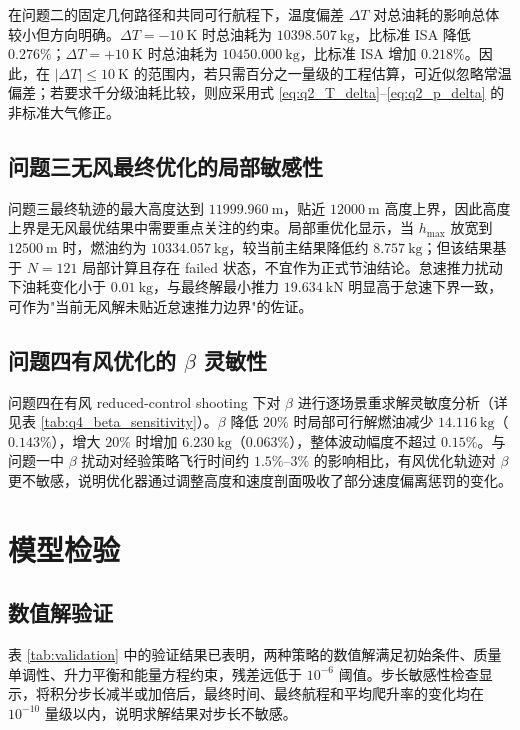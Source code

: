 \documentclass[withoutpreface,bwprint]{cumcmthesis}
\begin{document}
在问题二的固定几何路径和共同可行航程下，温度偏差 $\Delta T$ 对总油耗的影响总体较小但方向明确。$\Delta T=-10\ \mathrm{K}$ 时总油耗为 $10398.507\ \mathrm{kg}$，比标准 ISA 降低 $0.276\%$；$\Delta T=+10\ \mathrm{K}$ 时总油耗为 $10450.000\ \mathrm{kg}$，比标准 ISA 增加 $0.218\%$。因此，在 $|\Delta T|\leq10\ \mathrm{K}$ 的范围内，若只需百分之一量级的工程估算，可近似忽略常温偏差；若要求千分级油耗比较，则应采用式 \eqref{eq:q2_T_delta}--\eqref{eq:q2_p_delta} 的非标准大气修正。

\subsection{问题三无风最终优化的局部敏感性}

问题三最终轨迹的最大高度达到 $11999.960\ \mathrm{m}$，贴近 $12000\ \mathrm{m}$ 高度上界，因此高度上界是无风最优结果中需要重点关注的约束。局部重优化显示，当 $h_{\max}$ 放宽到 $12500\ \mathrm{m}$ 时，燃油约为 $10334.057\ \mathrm{kg}$，较当前主结果降低约 $8.757\ \mathrm{kg}$；但该结果基于 $N=121$ 局部计算且存在 failed 状态，不宜作为正式节油结论。怠速推力扰动下油耗变化小于 $0.01\ \mathrm{kg}$，与最终解最小推力 $19.634\ \mathrm{kN}$ 明显高于怠速下界一致，可作为"当前无风解未贴近怠速推力边界"的佐证。

\subsection{问题四有风优化的 $\beta$ 灵敏性}

问题四在有风 reduced-control shooting 下对 $\beta$ 进行逐场景重求解灵敏度分析（详见表 \ref{tab:q4_beta_sensitivity}）。$\beta$ 降低 $20\%$ 时局部可行解燃油减少 $14.116\ \mathrm{kg}$（$0.143\%$），增大 $20\%$ 时增加 $6.230\ \mathrm{kg}$（$0.063\%$），整体波动幅度不超过 $0.15\%$。与问题一中 $\beta$ 扰动对经验策略飞行时间约 $1.5\%$--$3\%$ 的影响相比，有风优化轨迹对 $\beta$ 更不敏感，说明优化器通过调整高度和速度剖面吸收了部分速度偏离惩罚的变化。

\section{模型检验}

\subsection{数值解验证}

表 \ref{tab:validation} 中的验证结果已表明，两种策略的数值解满足初始条件、质量单调性、升力平衡和能量方程约束，残差远低于 $10^{-6}$ 阈值。步长敏感性检查显示，将积分步长减半或加倍后，最终时间、最终航程和平均爬升率的变化均在 $10^{-10}$ 量级以内，说明求解结果对步长不敏感。
\end{document}
